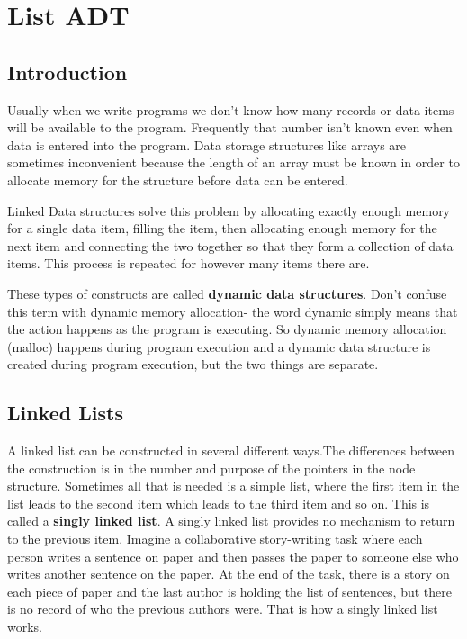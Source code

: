\chapter{List ADT} \label{lists}

\section{Introduction}
       Usually when we write programs we don’t know how many records or data items will be available to the program. Frequently that number isn’t known even when data is entered into the program. Data storage structures like arrays are sometimes inconvenient because the length of an array must be known in order to allocate memory for the structure before data can be entered.     
       
       Linked Data structures solve this problem by allocating exactly enough  memory for a single data item, filling the item, then allocating enough  memory for the next item and connecting the two together so that they form a collection of data items. This process is repeated for however many items there are.     

       These types of constructs are called \textbf{dynamic data structures}. Don’t confuse  this term with dynamic memory allocation- the word dynamic simply means that the action happens as the program is executing.  So dynamic memory allocation (malloc) happens during program execution and a dynamic data structure is created during program execution, but the two things are separate.   
   
   \section{Linked Lists}
       A linked list can be constructed in several different ways.The differences between the construction is in the number and purpose of the pointers in the node structure.  Sometimes all that is needed is a simple list, where the first item in the list leads to the second item which leads to the third item and so on.  This is called a \textbf{singly linked list}.  A singly linked list provides no mechanism to return to the previous item.  Imagine a collaborative story-writing task where each person writes a sentence on paper and then passes the paper to someone else who writes another sentence on the paper.  At the end of the task, there is a story on each piece of paper and the last author is holding the list of sentences, but there is no record of who the previous authors were.  That is how a singly linked list works.
       
